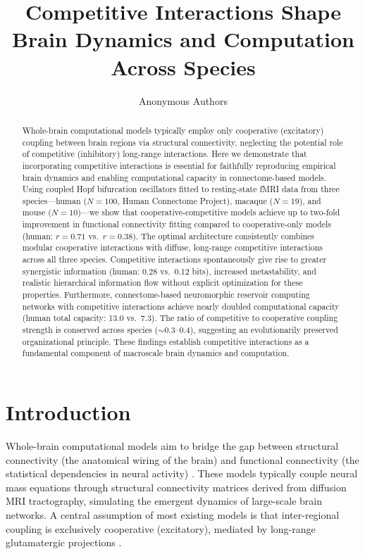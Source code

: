 \documentclass[11pt]{article}
\title{Competitive Interactions Shape Brain Dynamics and Computation Across Species}
\author{Anonymous Authors}
\date{}
\begin{document}
\maketitle

\begin{abstract}
Whole-brain computational models typically employ only cooperative (excitatory) coupling between brain regions via structural connectivity, neglecting the potential role of competitive (inhibitory) long-range interactions. Here we demonstrate that incorporating competitive interactions is essential for faithfully reproducing empirical brain dynamics and enabling computational capacity in connectome-based models. Using coupled Hopf bifurcation oscillators fitted to resting-state fMRI data from three species---human ($N=100$, Human Connectome Project), macaque ($N=19$), and mouse ($N=10$)---we show that cooperative-competitive models achieve up to two-fold improvement in functional connectivity fitting compared to cooperative-only models (human: $r = 0.71$ vs.\ $r = 0.38$). The optimal architecture consistently combines modular cooperative interactions with diffuse, long-range competitive interactions across all three species. Competitive interactions spontaneously give rise to greater synergistic information (human: 0.28 vs.\ 0.12 bits), increased metastability, and realistic hierarchical information flow without explicit optimization for these properties. Furthermore, connectome-based neuromorphic reservoir computing networks with competitive interactions achieve nearly doubled computational capacity (human total capacity: 13.0 vs.\ 7.3). The ratio of competitive to cooperative coupling strength is conserved across species ($\sim$0.3--0.4), suggesting an evolutionarily preserved organizational principle. These findings establish competitive interactions as a fundamental component of macroscale brain dynamics and computation.
\end{abstract}

\section{Introduction}

Whole-brain computational models aim to bridge the gap between structural connectivity (the anatomical wiring of the brain) and functional connectivity (the statistical dependencies in neural activity) \citep{deco2011emerging, breakspear2017dynamic}. These models typically couple neural mass equations through structural connectivity matrices derived from diffusion MRI tractography, simulating the emergent dynamics of large-scale brain networks. A central assumption of most existing models is that inter-regional coupling is exclusively cooperative (excitatory), mediated by long-range glutamatergic projections \citep{deco2014local}.
\end{document}
